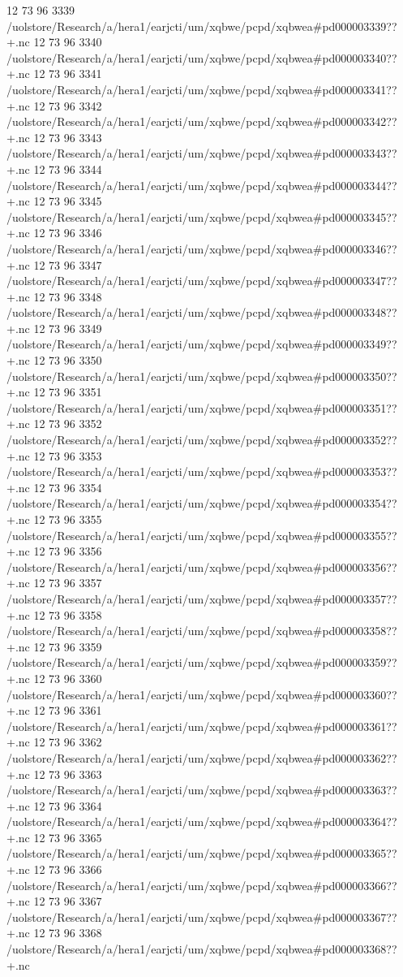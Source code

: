 12 73 96
3339
/uolstore/Research/a/hera1/earjcti/um/xqbwe/pcpd/xqbwea#pd000003339??+.nc
12 73 96
3340
/uolstore/Research/a/hera1/earjcti/um/xqbwe/pcpd/xqbwea#pd000003340??+.nc
12 73 96
3341
/uolstore/Research/a/hera1/earjcti/um/xqbwe/pcpd/xqbwea#pd000003341??+.nc
12 73 96
3342
/uolstore/Research/a/hera1/earjcti/um/xqbwe/pcpd/xqbwea#pd000003342??+.nc
12 73 96
3343
/uolstore/Research/a/hera1/earjcti/um/xqbwe/pcpd/xqbwea#pd000003343??+.nc
12 73 96
3344
/uolstore/Research/a/hera1/earjcti/um/xqbwe/pcpd/xqbwea#pd000003344??+.nc
12 73 96
3345
/uolstore/Research/a/hera1/earjcti/um/xqbwe/pcpd/xqbwea#pd000003345??+.nc
12 73 96
3346
/uolstore/Research/a/hera1/earjcti/um/xqbwe/pcpd/xqbwea#pd000003346??+.nc
12 73 96
3347
/uolstore/Research/a/hera1/earjcti/um/xqbwe/pcpd/xqbwea#pd000003347??+.nc
12 73 96
3348
/uolstore/Research/a/hera1/earjcti/um/xqbwe/pcpd/xqbwea#pd000003348??+.nc
12 73 96
3349
/uolstore/Research/a/hera1/earjcti/um/xqbwe/pcpd/xqbwea#pd000003349??+.nc
12 73 96
3350
/uolstore/Research/a/hera1/earjcti/um/xqbwe/pcpd/xqbwea#pd000003350??+.nc
12 73 96
3351
/uolstore/Research/a/hera1/earjcti/um/xqbwe/pcpd/xqbwea#pd000003351??+.nc
12 73 96
3352
/uolstore/Research/a/hera1/earjcti/um/xqbwe/pcpd/xqbwea#pd000003352??+.nc
12 73 96
3353
/uolstore/Research/a/hera1/earjcti/um/xqbwe/pcpd/xqbwea#pd000003353??+.nc
12 73 96
3354
/uolstore/Research/a/hera1/earjcti/um/xqbwe/pcpd/xqbwea#pd000003354??+.nc
12 73 96
3355
/uolstore/Research/a/hera1/earjcti/um/xqbwe/pcpd/xqbwea#pd000003355??+.nc
12 73 96
3356
/uolstore/Research/a/hera1/earjcti/um/xqbwe/pcpd/xqbwea#pd000003356??+.nc
12 73 96
3357
/uolstore/Research/a/hera1/earjcti/um/xqbwe/pcpd/xqbwea#pd000003357??+.nc
12 73 96
3358
/uolstore/Research/a/hera1/earjcti/um/xqbwe/pcpd/xqbwea#pd000003358??+.nc
12 73 96
3359
/uolstore/Research/a/hera1/earjcti/um/xqbwe/pcpd/xqbwea#pd000003359??+.nc
12 73 96
3360
/uolstore/Research/a/hera1/earjcti/um/xqbwe/pcpd/xqbwea#pd000003360??+.nc
12 73 96
3361
/uolstore/Research/a/hera1/earjcti/um/xqbwe/pcpd/xqbwea#pd000003361??+.nc
12 73 96
3362
/uolstore/Research/a/hera1/earjcti/um/xqbwe/pcpd/xqbwea#pd000003362??+.nc
12 73 96
3363
/uolstore/Research/a/hera1/earjcti/um/xqbwe/pcpd/xqbwea#pd000003363??+.nc
12 73 96
3364
/uolstore/Research/a/hera1/earjcti/um/xqbwe/pcpd/xqbwea#pd000003364??+.nc
12 73 96
3365
/uolstore/Research/a/hera1/earjcti/um/xqbwe/pcpd/xqbwea#pd000003365??+.nc
12 73 96
3366
/uolstore/Research/a/hera1/earjcti/um/xqbwe/pcpd/xqbwea#pd000003366??+.nc
12 73 96
3367
/uolstore/Research/a/hera1/earjcti/um/xqbwe/pcpd/xqbwea#pd000003367??+.nc
12 73 96
3368
/uolstore/Research/a/hera1/earjcti/um/xqbwe/pcpd/xqbwea#pd000003368??+.nc
